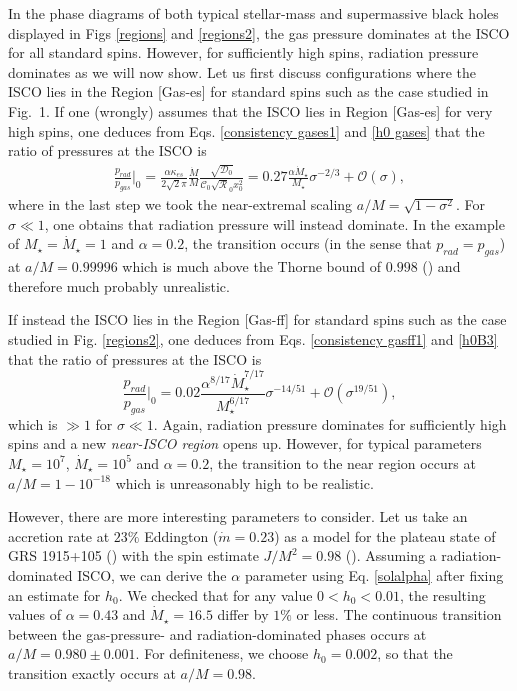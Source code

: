 \documentclass[a4paper,fleqn,usenatbib]{mnrasMOD}
\numberwithin{equation}{section}
\newcommand{\bea}{\begin{eqnarray}}
\newcommand{\eea}{\end{eqnarray}}
\newcommand{\be}{\begin{equation}}
\newcommand{\ee}{\end{equation}}
\begin{document}
In the phase diagrams of both typical stellar-mass and supermassive black holes displayed in Figs \ref{regions} and \ref{regions2}, the gas pressure dominates at the ISCO for all standard spins. However, for sufficiently high spins, radiation pressure dominates as we will now show. Let us first discuss configurations where the ISCO lies in the Region [Gas-es] for standard spins such as the case studied in Fig.~1. If one (wrongly) assumes that the ISCO lies in Region [Gas-es] for very high spins, one deduces from Eqs. \eqref{consistency gases1} and \eqref{h0 gases} that the ratio of pressures at the ISCO is 
\bea
\frac{p_{rad}}{p_{gas}}\Bigg|_{0} = \frac{\alpha \kappa_{es}}{2\sqrt{2}\pi} \frac{\dot M}{M} \frac{\sqrt{\mathcal D_0}}{\mathcal C_0 \sqrt{\mathcal R}_0 x_0^2} = 0.27 \frac{\alpha \dot M_{\star}}{M_\star} \sigma^{-2/3}+\mathcal{O}(\sigma),
\eea
where in the last step we took the near-extremal scaling $a/M=\sqrt{1-\sigma^2}$. For $\sigma \ll 1$, one obtains that radiation pressure will instead dominate. In the example of $M_\star = \dot M_\star = 1$ and $\alpha = 0.2$, the transition occurs (in the sense that $p_{rad}=p_{gas}$) at $a/M = 0.99996$ which is much above the Thorne bound of $0.998$ (\cite{1974ApJ...191..507T}) and therefore much probably unrealistic. 

If instead the ISCO lies in the Region [Gas-ff] for standard spins such as the case studied in Fig. \ref{regions2}, one deduces from Eqs. \eqref{consistency gasff1} and \eqref{h0B3} that the ratio of pressures at the ISCO is 
\be
\frac{p_{rad}}{p_{gas}}\Bigg|_0 = 0.02 \frac{\alpha^{8/17}\dot{M}_\star^{7/17}}{M_\star^{6/17}} \sigma^{-14/51}+\mathcal{O}\left(\sigma^{19/51}\right),
\ee
which is $\gg 1$ for $\sigma \ll 1$. Again, radiation pressure dominates for sufficiently high spins and a new \emph{near-ISCO region} opens up. However, for typical parameters $M_\star = 10^7$, $\dot M_\star = 10^5$ and $\alpha=0.2$, the transition to the near region occurs at $a/M=1-10^{-18}$ which is unreasonably high to be realistic. 


However, there are more interesting parameters to consider. Let us  take an accretion rate at $23 \%$ Eddington ($\dot m = 0.23$) as a model for the plateau state of GRS 1915+105 (\cite{2041-8205-775-2-L45}) with the spin estimate $J/M^2=0.98$ (\cite{Reid:2014ywa}). Assuming a radiation-dominated ISCO, we can derive the $\alpha$ parameter using Eq. \eqref{solalpha} after fixing an estimate for $h_0$. We checked that for any value $0 < h_0< 0.01$, the resulting values of $\alpha=0.43$ and $\dot{M}_{\star} = 16.5$ differ by $1\%$ or less. The continuous transition between the gas-pressure- and radiation-dominated phases occurs at $a/M=0.980 \pm  0.001$. For definiteness, we choose $h_{0}=0.002$, so that the transition exactly occurs at $a/M=0.98$.
\end{document}
